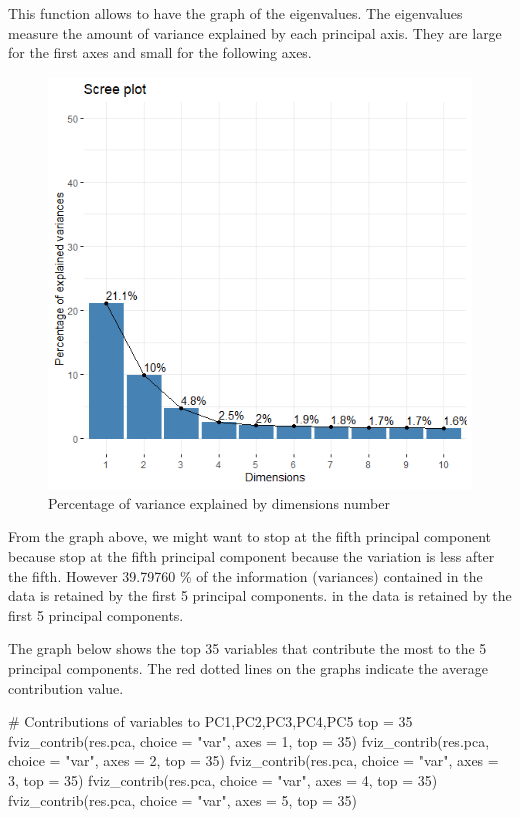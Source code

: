 \documentclass[12pt]{article}
\begin{document}
This function allows to have the graph of the eigenvalues.
The eigenvalues measure the amount of variance explained by each principal axis. They are large for the first axes and small for the following axes.


\begin{figure}[H]
\begin{center}
\includegraphics[scale=1.]{ACP_0.png} 
\caption[]{Percentage of variance explained by dimensions number }
\end{center}
\end{figure}

From the graph above, we might want to stop at the fifth principal component because 
stop at the fifth principal component because the variation is less after the fifth.
However 39.79760 \% of the information (variances) contained in the data is retained by the first 5 principal components.
in the data is retained by the first 5 principal components.


The graph below shows the top 35 variables that contribute the most to the 5 principal components. 
The red dotted lines on the graphs indicate the average contribution value.
 
\begin{customFrame}
# Contributions of variables to PC1,PC2,PC3,PC4,PC5 top = 35 
fviz_contrib(res.pca, choice = "var", axes = 1, top = 35) 
fviz_contrib(res.pca, choice = "var", axes = 2, top = 35) 
fviz_contrib(res.pca, choice = "var", axes = 3, top = 35) 
fviz_contrib(res.pca, choice = "var", axes = 4, top = 35) 
fviz_contrib(res.pca, choice = "var", axes = 5, top = 35) 
\end{customFrame}
\end{document}

